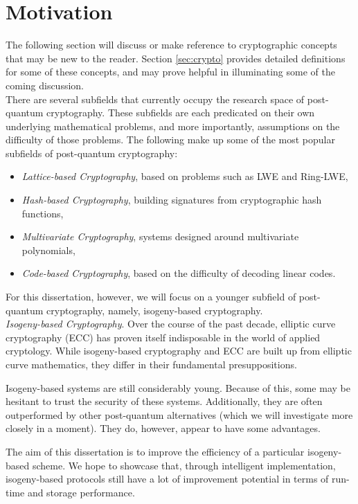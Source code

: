 \section{Motivation}
\label{sec:motivation}

The following section will discuss or make reference to cryptographic concepts that may be new to the reader. Section  \ref{sec:crypto} provides detailed definitions for some of these concepts, and may prove helpful in illuminating some of the coming discussion.\\

There are several subfields that currently occupy the research space of post-quantum cryptography. These subfields are each predicated on their own underlying mathematical problems, and more importantly, assumptions on the difficulty of those problems. The following make up some of the most popular subfields of post-quantum cryptography: 
\begin{itemize}
\item \textit{Lattice-based Cryptography}, based on problems such as LWE and Ring-LWE, 
\item \textit{Hash-based Cryptography}, building signatures from cryptographic hash functions, 
\item \textit{Multivariate Cryptography}, systems designed around multivariate polynomials, 
\item \textit{Code-based Cryptography}, based on the difficulty of decoding linear codes.
\end{itemize}

For this dissertation, however, we will focus on a younger subfield of post-quantum cryptography, namely, isogeny-based cryptography.\\

\noindent
\textit{Isogeny-based Cryptography}. Over the course of the past decade, elliptic curve cryptography (ECC) has proven itself indisposable in the world of applied cryptology. While isogeny-based cryptography and ECC are built up from elliptic curve mathematics, they differ in their fundamental presuppositions.

Isogeny-based systems are still considerably young. Because of this, some may be hesitant to trust the security of these systems. Additionally, they are often outperformed by other post-quantum alternatives (which we will investigate more closely in a moment). They do, however, appear to have some advantages. 

The aim of this dissertation is to improve the efficiency of a particular isogeny-based scheme. We hope to showcase that, through intelligent implementation, isogeny-based protocols still have a lot of improvement potential in terms of run-time and storage performance.

